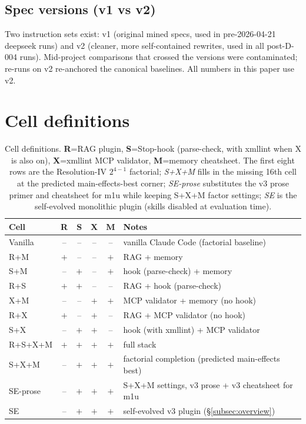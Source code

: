 \documentclass{article}
\begin{document}
\subsection{Spec versions (v1 vs v2)}
Two instruction sets exist: v1 (original mined specs, used in pre-2026-04-21 deepseek runs) and v2 (cleaner, more self-contained rewrites, used in all post-D-004 runs). Mid-project comparisons that crossed the versions were contaminated; re-runs on v2 re-anchored the canonical baselines. All numbers in this paper use v2.

\section{Cell definitions}
\label{app:cells}

\begin{table}[h]
  \caption{Cell definitions. \textbf{R}=RAG plugin, \textbf{S}=Stop-hook (parse-check, with xmllint when X is also on), \textbf{X}=xmllint MCP validator, \textbf{M}=memory cheatsheet. The first eight rows are the Resolution-IV $2^{4-1}$ factorial; \emph{S+X+M} fills in the missing 16th cell at the predicted main-effects-best corner; \emph{SE-prose} substitutes the v3 prose primer and cheatsheet for m1u while keeping S+X+M factor settings; \emph{SE} is the self-evolved monolithic plugin (skills disabled at evaluation time).}
  \label{tab:cells}
  \centering
  \small
  \begin{tabular}{lccccl}
    \toprule
    \textbf{Cell} & \textbf{R} & \textbf{S} & \textbf{X} & \textbf{M} & \textbf{Notes} \\
    \midrule
    Vanilla & --  & --  & --  & --  & vanilla Claude Code (factorial baseline)               \\
    R+M & $+$ & --  & --  & $+$ & RAG + memory                                           \\
    S+M & --  & $+$ & --  & $+$ & hook (parse-check) + memory                            \\
    R+S & $+$ & $+$ & --  & --  & RAG + hook (parse-check)                               \\
    X+M & --  & --  & $+$ & $+$ & MCP validator + memory (no hook)                       \\
    R+X & $+$ & --  & $+$ & --  & RAG + MCP validator (no hook)                          \\
    S+X & --  & $+$ & $+$ & --  & hook (with xmllint) + MCP validator                    \\
    R+S+X+M & $+$ & $+$ & $+$ & $+$ & full stack                                         \\
    \midrule
    S+X+M    & --  & $+$ & $+$ & $+$ & factorial completion (predicted main-effects best) \\
    SE-prose & --  & $+$ & $+$ & $+$ & S+X+M settings, v3 prose + v3 cheatsheet for m1u   \\
    SE       & --  & $+$ & $+$ & $+$ & self-evolved v3 plugin (\S\ref{subsec:overview})  \\
    \bottomrule
  \end{tabular}
\end{table}
\end{document}
